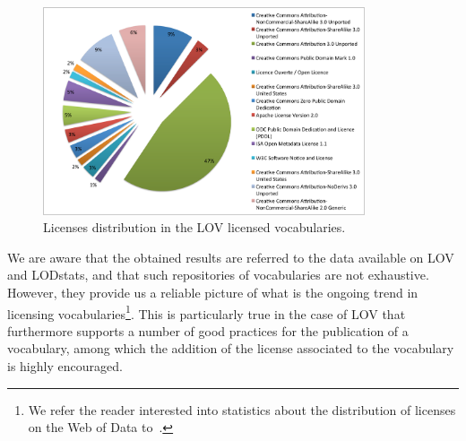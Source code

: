 \begin{figure}
\centering
\includegraphics[width=9.5cm]{img/LOV-stats.pdf}
\caption{Licenses distribution in the LOV licensed vocabularies.}
\label{fig:LOVstats}
\end{figure}

We are aware that the obtained results are referred to the data available on LOV and LODstats, and that such repositories of vocabularies are not exhaustive. However, they provide us a reliable picture of what is the ongoing trend in licensing vocabularies\footnote{We refer the reader interested into statistics about the distribution of licenses on the Web of Data to~\cite{DBLP:conf/semweb/Rodriguez-DoncelGM13,DBLP:conf/semweb/GovernatoriRVG13}.}. This is particularly true in the case of LOV that furthermore supports a number of good practices for the publication of a vocabulary, among which the addition of the license associated to the vocabulary is highly encouraged.


